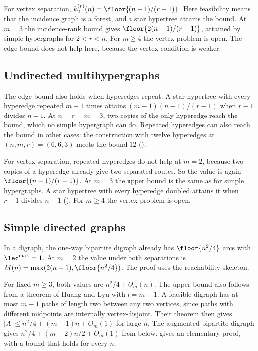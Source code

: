 For vertex separation, $k_2^{(r)}(n)=\floor{(n-1)/(r-1)}$.
Here feasibility means that the incidence graph is a forest, and a star hypertree attains the bound.
At $m=3$ the incidence-rank bound gives $\floor{2(n-1)/(r-1)}$, attained by simple hypergraphs for $2<r<n$.
For $m\ge4$ the vertex problem is open.
The edge bound does not help here, because the vertex condition is weaker.

\subsection{Undirected multihypergraphs}
\label{sec:status-multihypergraph}

The edge bound also holds when hyperedges repeat.
A star hypertree with every hyperedge repeated $m-1$ times attains $(m-1)(n-1)/(r-1)$ when $r-1$ divides $n-1$.
At $n=r=m=3$, two copies of the only hyperedge reach the bound, which no simple hypergraph can do.
Repeated hyperedges can also reach the bound in other cases: the construction with twelve hyperedges at $(n,m,r)=(6,6,3)$ meets the bound $12$ ().

For vertex separation, repeated hyperedges do not help at $m=2$, because two copies of a hyperedge already give two separated routes.
So the value is again $\floor{(n-1)/(r-1)}$.
At $m=3$ the upper bound is the same as for simple hypergraphs.
A star hypertree with every hyperedge doubled attains it when $r-1$ divides $n-1$ ().
For $m\ge4$ the vertex problem is open.


\subsection{Simple directed graphs}
\label{sec:status-simple-directed}

In a digraph, the one-way bipartite digraph already has $\floor{n^2/4}$ arcs with $\lec^{\max}=1$.
At $m=2$ the value under both separations is $M(n)=\max(2(n-1),\floor{n^2/4})$.
The proof uses the reachability skeleton.

For fixed $m\ge3$, both values are $n^2/4+\Theta_m(n)$.
The upper bound also follows from a theorem of Huang and Lyu \cite[Theorem~2]{HuangLyu26} with $t=m-1$.
A feasible digraph has at most $m-1$ paths of length two between any two vertices, since paths with different midpoints are internally vertex-disjoint.
Their theorem then gives $|A|\le n^2/4+(m-1)n+O_m(1)$ for large $n$.
The augmented bipartite digraph gives $n^2/4+(m-2)n/2+O_m(1)$ from below.
 gives an elementary proof, with a bound that holds for every $n$.

